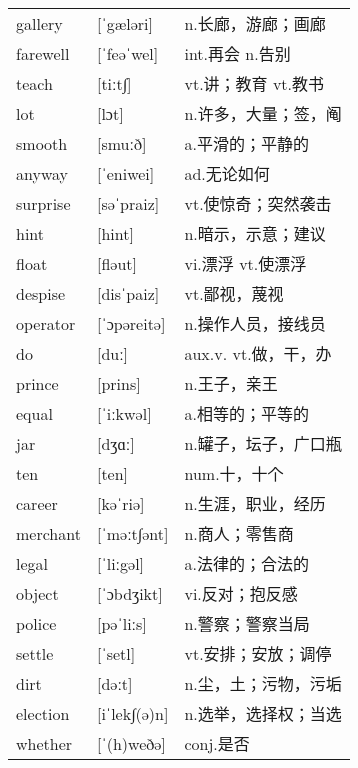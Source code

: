 \documentclass[a4paper]{article}
\begin{document}
\section{}
\begin{tabular}{l l l}

gallery & [ˈgæləri] & n.长廊，游廊；画廊 \\
farewell & [ˈfeəˈwel] & int.再会 n.告别 \\
teach & [tiːt∫] & vt.讲；教育 vt.教书 \\
lot & [lɔt] & n.许多，大量；签，阄 \\
smooth & [smuːð] & a.平滑的；平静的 \\
anyway & [ˈeniwei] & ad.无论如何 \\
surprise & [səˈpraiz] & vt.使惊奇；突然袭击 \\
hint & [hint] & n.暗示，示意；建议 \\
float & [fləut] & vi.漂浮 vt.使漂浮 \\
despise & [disˈpaiz] & vt.鄙视，蔑视 \\
operator & [ˈɔpəreitə] & n.操作人员，接线员 \\
do & [duː] & aux.v. vt.做，干，办 \\
prince & [prins] & n.王子，亲王 \\
equal & [ˈiːkwəl] & a.相等的；平等的 \\
jar & [dʒɑː] & n.罐子，坛子，广口瓶 \\
ten & [ten] & num.十，十个 \\
career & [kəˈriə] & n.生涯，职业，经历 \\
merchant & [ˈməːt∫ənt] & n.商人；零售商 \\
legal & [ˈliːgəl] & a.法律的；合法的 \\
object & [ˈɔbdʒikt] & vi.反对；抱反感 \\
police & [pəˈliːs] & n.警察；警察当局 \\
settle & [ˈsetl] & vt.安排；安放；调停 \\
dirt & [dəːt] & n.尘，土；污物，污垢 \\
election & [iˈlek∫(ə)n] & n.选举，选择权；当选 \\
whether & [ˈ(h)weðə] & conj.是否 \\

\end{tabular}
\end{document}
